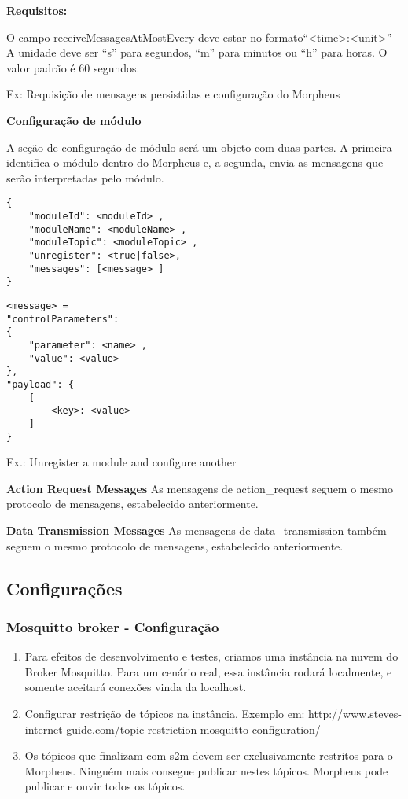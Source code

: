 \textbf{Requisitos:}

O campo receiveMessagesAtMostEvery deve estar no formato“\textless time\textgreater :\textless unit\textgreater ”
A unidade deve ser “s” para segundos, “m” para minutos ou “h” para horas. O valor padrão é 60 segundos.

Ex: Requisição de mensagens persistidas e configuração do Morpheus

\textbf{Configuração de módulo}

A seção de configuração de módulo será um objeto com duas partes. A primeira identifica o módulo dentro do Morpheus e, a segunda, envia as mensagens que serão interpretadas pelo módulo.
\begin{lstlisting}
{
    "moduleId": <moduleId> ,
    "moduleName": <moduleName> ,
    "moduleTopic": <moduleTopic> ,
    "unregister": <true|false>,
    "messages": [<message> ]
}
\end{lstlisting}

\begin{lstlisting}
<message> = 
"controlParameters":
{
    "parameter": <name> ,
    "value": <value>
},
"payload": {
    [
        <key>: <value>
    ]
}
\end{lstlisting}

Ex.: Unregister a module and configure another


\textbf{Action Request Messages}
As mensagens de action\_request seguem o mesmo protocolo de mensagens, estabelecido anteriormente.

\textbf{Data Transmission Messages}
As mensagens de data\_transmission também seguem o mesmo protocolo de mensagens, estabelecido anteriormente.

\subsection{Configurações}

\subsubsection{\wmqtt Mosquitto broker - Configuração}

\begin{enumerate}
\item Para efeitos de desenvolvimento e testes, criamos uma instância na nuvem do \wmqtt Broker Mosquitto. Para um cenário real, essa instância rodará localmente, e somente aceitará conexões vinda da localhost.
\item Configurar restrição de tópicos na instância. Exemplo em: http://www.steves-internet-guide.com/topic-restriction-mosquitto-configuration/
\item Os tópicos que finalizam com s2m devem ser exclusivamente restritos para o Morpheus. Ninguém mais consegue publicar nestes tópicos. Morpheus pode publicar e ouvir todos os tópicos.
\end{enumerate}

